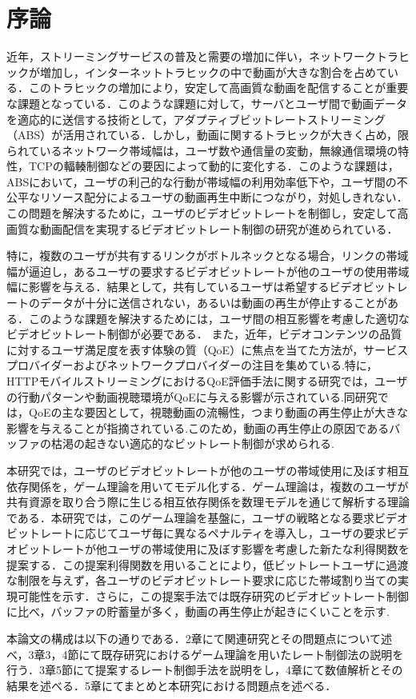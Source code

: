 \chapter{序論}
近年，ストリーミングサービスの普及と需要の増加に伴い，ネットワークトラヒックが増加し，インターネットトラヒックの中で動画が大きな割合を占めている．このトラヒックの増加により，安定して高画質な動画を配信することが重要な課題となっている\cite{kison}\cite{motomoto}．このような課題に対して，サーバとユーザ間で動画データを適応的に送信する技術として，アダプティブビットレートストリーミング（ABS）が活用されている．しかし，動画に関するトラヒックが大きく占め，限られているネットワーク帯域幅は，ユーザ数や通信量の変動，無線通信環境の特性，TCPの輻輳制御などの要因によって動的に変化する\cite{C.Wang}．このような課題は，ABSにおいて，ユーザの利己的な行動が帯域幅の利用効率低下や，ユーザ間の不公平なリソース配分によるユーザの動画再生中断につながり，対処しきれない\cite{kison}\cite{C.Wang}．この問題を解決するために，ユーザのビデオビットレートを制御し，安定して高画質な動画配信を実現するビデオビットレート制御の研究が進められている\cite{kison}\cite{motomoto}\cite{Thang}\cite{Mao}\cite{Xu}．

特に，複数のユーザが共有するリンクがボトルネックとなる場合，リンクの帯域幅が逼迫し，あるユーザの要求するビデオビットレートが他のユーザの使用帯域幅に影響を与える．結果として，共有しているユーザは希望するビデオビットレートのデータが十分に送信されない，あるいは動画の再生が停止することがある．このような課題を解決するためには，ユーザ間の相互影響を考慮した適切なビデオビットレート制御が必要である．
また，近年，ビデオコンテンツの品質に対するユーザ満足度を表す体験の質（QoE）に焦点を当てた方法が，サービスプロバイダーおよびネットワークプロバイダーの注目を集めている\cite{kison}.特に，HTTPモバイルストリーミングにおけるQoE評価手法に関する研究では，ユーザの行動パターンや動画視聴環境がQoEに与える影響が示されている\cite{Y.Huang}.同研究では，QoEの主な要因として，視聴動画の流暢性，つまり動画の再生停止が大きな影響を与えることが指摘されている.このため，動画の再生停止の原因であるバッファの枯渇の起きない適応的なビットレート制御が求められる.

本研究では，ユーザのビデオビットレートが他のユーザの帯域使用に及ぼす相互依存関係を，ゲーム理論を用いてモデル化する．ゲーム理論は，複数のユーザが共有資源を取り合う際に生じる相互依存関係を数理モデルを通じて解析する理論である\cite{okada2011}．本研究では，このゲーム理論を基盤に，ユーザの戦略となる要求ビデオビットレートに応じてユーザ毎に異なるペナルティを導入し，ユーザの要求ビデオビットレートが他ユーザの帯域使用に及ぼす影響を考慮した新たな利得関数を提案する．この提案利得関数を用いることにより，低ビットレートユーザに過渡な制限を与えず，各ユーザのビデオビットレート要求に応じた帯域割り当ての実現可能性を示す．さらに，この提案手法では既存研究\cite{kison}のビデオビットレート制御に比べ，バッファの貯蓄量が多く，動画の再生停止が起きにくいことを示す.

本論文の構成は以下の通りである．2章にて関連研究とその問題点について述べ，3章3，4節にて既存研究におけるゲーム理論を用いたレート制御法の説明を行う．3章5節にて提案するレート制御手法を説明をし，4章にて数値解析とその結果を述べる．5章にてまとめと本研究における問題点を述べる．


